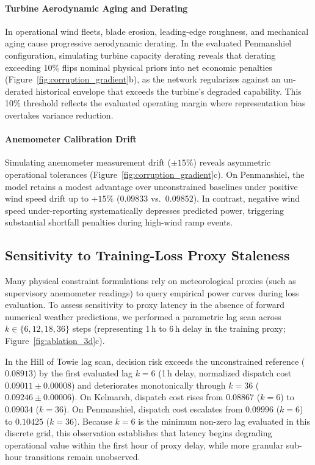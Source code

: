 \paragraph{Turbine Aerodynamic Aging and Derating}
In operational wind fleets, blade erosion, leading-edge roughness, and mechanical aging cause progressive aerodynamic derating. In the evaluated Penmanshiel configuration, simulating turbine capacity derating reveals that derating exceeding 10\% flips nominal physical priors into net economic penalties (Figure~\ref{fig:corruption_gradient}b), as the network regularizes against an un-derated historical envelope that exceeds the turbine's degraded capability. This 10\% threshold reflects the evaluated operating margin where representation bias overtakes variance reduction.

\paragraph{Anemometer Calibration Drift}
Simulating anemometer measurement drift ($\pm 15\%$) reveals asymmetric operational tolerances (Figure~\ref{fig:corruption_gradient}c). On Penmanshiel, the model retains a modest advantage over unconstrained baselines under positive wind speed drift up to $+15\%$ ($0.09833$ vs.\ $0.09852$). In contrast, negative wind speed under-reporting systematically depresses predicted power, triggering substantial shortfall penalties during high-wind ramp events.

\subsection{Sensitivity to Training-Loss Proxy Staleness}
Many physical constraint formulations rely on meteorological proxies (such as supervisory anemometer readings) to query empirical power curves during loss evaluation. To assess sensitivity to proxy latency in the absence of forward numerical weather predictions, we performed a parametric lag scan across $k \in \{6, 12, 18, 36\}$ steps (representing 1\,h to 6\,h delay in the training proxy; Figure~\ref{fig:ablation_3d}c).

In the Hill of Towie lag scan, decision risk exceeds the unconstrained reference ($0.08913$) by the first evaluated lag $k=6$ (1\,h delay, normalized dispatch cost $0.09011 \pm 0.00008$) and deteriorates monotonically through $k=36$ ($0.09246 \pm 0.00006$). On Kelmarsh, dispatch cost rises from $0.08867$ ($k=6$) to $0.09034$ ($k=36$). On Penmanshiel, dispatch cost escalates from $0.09996$ ($k=6$) to $0.10425$ ($k=36$). Because $k=6$ is the minimum non-zero lag evaluated in this discrete grid, this observation establishes that latency begins degrading operational value within the first hour of proxy delay, while more granular sub-hour transitions remain unobserved.

